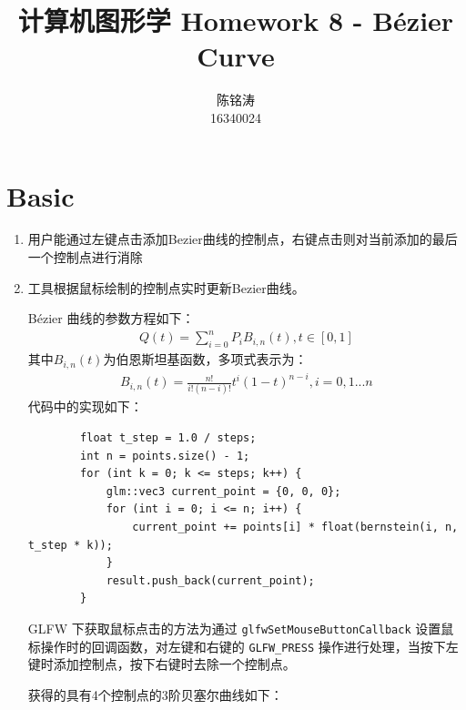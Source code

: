 \documentclass[12pt]{article}
\begin{document}
\author{陈铭涛\\16340024}
\title{计算机图形学 Homework 8 - Bézier Curve}
\maketitle

\medskip


\section{Basic}

\begin{enumerate}
    \item 用户能通过左键点击添加Bezier曲线的控制点，右键点击则对当前添加的最后一个控制点进行消除
    \item 工具根据鼠标绘制的控制点实时更新Bezier曲线。
    

    Bézier 曲线的参数方程如下：
    \begin{equation}
        \begin{aligned}
        Q(t) = \sum_{i=0}^{n}P_iB_{i, n}(t), t\in[0, 1]
        \end{aligned}
    \end{equation}
    其中$B_{i, n}(t)$为伯恩斯坦基函数，多项式表示为：
    \begin{equation}
        \begin{aligned}
        B_{i, n}(t) = \frac{n!}{i!(n-i)!}t^i(1-t)^{n-i}, i=0,1...n
        \end{aligned}
    \end{equation}
    代码中的实现如下：
    \begin{lstlisting}
        float t_step = 1.0 / steps;
        int n = points.size() - 1;
        for (int k = 0; k <= steps; k++) {
            glm::vec3 current_point = {0, 0, 0};
            for (int i = 0; i <= n; i++) {
                current_point += points[i] * float(bernstein(i, n, t_step * k));
            }
            result.push_back(current_point);
        }
    \end{lstlisting}

    GLFW 下获取鼠标点击的方法为通过 \lstinline{glfwSetMouseButtonCallback} 设置鼠标操作时的回调函数，对左键和右键的 \lstinline{GLFW_PRESS} 操作进行处理，当按下左键时添加控制点，按下右键时去除一个控制点。

    获得的具有4个控制点的3阶贝塞尔曲线如下：


\end{enumerate}
\end{document}
